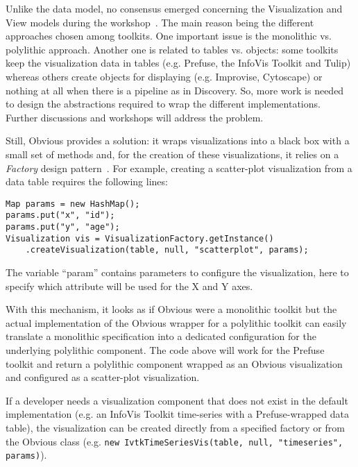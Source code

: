 \label{sec:viewvis}
Unlike the data model, no consensus emerged concerning the
Visualization and View models during the
workshop~\cite{vismaster2008}.  The main reason being the different
approaches chosen among toolkits.  One important issue is the
monolithic vs. polylithic approach. Another one is related to tables
vs. objects: some toolkits keep the visualization data in tables
(e.g. Prefuse, the InfoVis Toolkit and Tulip) whereas others create
objects for displaying (e.g. Improvise, Cytoscape) or nothing at all
when there is a pipeline as in Discovery.  So, more work is needed to
design the abstractions required to wrap the different
implementations.  Further discussions and workshops will address the
problem.

Still, Obvious provides a solution: it wraps visualizations into a
black box with a small set of methods and, for the creation of these
visualizations, it relies on a \emph{Factory} design
pattern~\cite{DesignPatterns}.  For example, creating a scatter-plot
visualization from a data table requires the following lines:
\begin{lstlisting}
Map params = new HashMap();
params.put("x", "id");
params.put("y", "age");
Visualization vis = VisualizationFactory.getInstance()
    .createVisualization(table, null, "scatterplot", params);
\end{lstlisting}
The variable ``param'' contains parameters to configure the
visualization, here to specify which attribute will be used for the X
and Y axes.

With this mechanism, it looks as if Obvious were a monolithic toolkit
but the actual implementation of the Obvious wrapper for a polylithic
toolkit can easily translate a monolithic specification into a
dedicated configuration for the underlying polylithic component.  The
code above will work for the Prefuse toolkit and return a polylithic
component wrapped as an Obvious visualization and configured as a
scatter-plot visualization.

If a developer needs a visualization component that does not exist in
the default implementation (e.g. an InfoVis Toolkit time-series with a
Prefuse-wrapped data table), the visualization can be created directly
from a specified factory or from the Obvious class
(e.g. \lstinline!new IvtkTimeSeriesVis(table, null, "timeseries", params)!).

